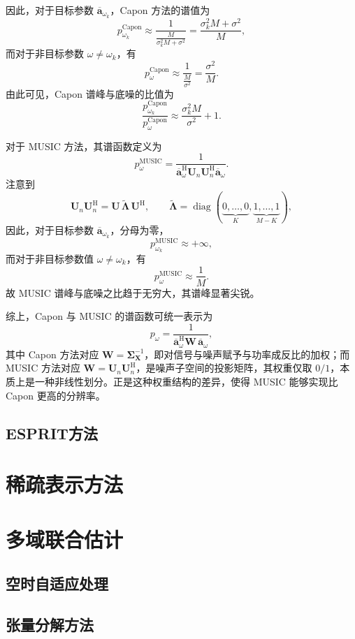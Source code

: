 因此，对于目标参数 \(\overline{\bm{a}}_{\omega_k}\)，Capon 方法的谱值为
\[
    p_{\omega_k}^{\text{Capon}}
    \approx \frac{1}{\tfrac{M}{\sigma_k^2 M + \sigma^2}}
    = \frac{\sigma_k^2 M + \sigma^2}{M},
\]
而对于非目标参数 \(\omega \neq \omega_k\)，有
\[
    p_{\omega}^{\text{Capon}}
    \approx \frac{1}{\tfrac{M}{\sigma^2}}
    = \frac{\sigma^2}{M}.
\]
由此可见，Capon 谱峰与底噪的比值为
\[
    \frac{p_{\omega_k}^{\text{Capon}}}{p_{\omega}^{\text{Capon}}}
    \approx \frac{\sigma_k^2 M}{\sigma^2} + 1.
\]

对于 MUSIC 方法，其谱函数定义为
\[
    p_{\omega}^{\text{MUSIC}}
    = \frac{1}{\overline{\bm{a}}_{\omega}^{\mathrm{H}}
    \mathbf{U}_n \mathbf{U}_n^{\mathrm{H}}
    \overline{\bm{a}}_{\omega}}.
\]
注意到
\[
    \mathbf{U}_n \mathbf{U}_n^{\mathrm{H}}
    = \mathbf{U}\,\tilde{\mathbf{\Lambda}}\,\mathbf{U}^{\mathrm{H}}, \qquad
    \tilde{\mathbf{\Lambda}}
    = \operatorname{diag}(\underbrace{0,\dots,0}_{K},
    \underbrace{1,\dots,1}_{M-K}),
\]
因此，对于目标参数 \(\overline{\bm{a}}_{\omega_k}\)，分母为零，
\[
    p_{\omega_k}^{\text{MUSIC}} \approx +\infty,
\]
而对于非目标参数值 \(\omega \neq \omega_k\)，有
\[
    p_{\omega}^{\text{MUSIC}} \approx \frac{1}{M}.
\]
故 MUSIC 谱峰与底噪之比趋于无穷大，其谱峰显著尖锐。

综上，Capon 与 MUSIC 的谱函数可统一表示为
\[
    p_{\omega} = \frac{1}{\overline{\bm{a}}_{\omega}^{\mathrm{H}}
        \mathbf{W}\,\overline{\bm{a}}_{\omega}},
\]
其中 Capon 方法对应 \(\mathbf{W} = \mathbf{\Sigma}_{\mathbf{X}}^{-1}\)，即对信号与噪声赋予与功率成反比的加权；而 MUSIC 方法对应 \(\mathbf{W} = \mathbf{U}_n \mathbf{U}_n^{\mathrm{H}}\)，是噪声子空间的投影矩阵，其权重仅取 \(0/1\)，本质上是一种非线性划分。正是这种权重结构的差异，使得 MUSIC 能够实现比 Capon 更高的分辨率。

\subsection{ESPRIT方法}

\section{稀疏表示方法}

\section{多域联合估计}

\subsection{空时自适应处理}

\subsection{张量分解方法}
